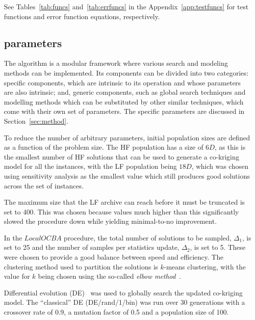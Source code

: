 See Tables~\ref{tab:funcs} and~\ref{tab:errfuncs} in the Appendix~\ref{app:testfuncs} for test functions and error function equations, respectively.

\subsection{\AlgName{} parameters}
The \AlgName{} algorithm is a modular framework where various search and modeling methods can be implemented. Its components can be divided into two categories: \AlgName{} specific components, which are intrinsic to its operation and whose parameters are also intrinsic; and, generic components, such as global search techniques and modelling methods which can be substituted by other similar techniques, which come with their own set of parameters. The \AlgName{} specific parameters are discussed in Section~\ref{sec:method}.

To reduce the number of arbitrary parameters, initial population sizes are defined as a function of the problem size. The HF population has a size of $6D$, as this is the smallest number of HF solutions that can be used to generate a co-kriging model for all the instances, with the LF population being $18D$, which was chosen using sensitivity analysis as the smallest value which still produces good solutions across the set of instances.

The maximum size that the LF archive can reach before it must be truncated is set to 400. This was chosen because values much higher than this significantly slowed the procedure down while yielding minimal-to-no improvement. 

In the $LocalOCBA$ procedure, the total number of solutions to be sampled, $\Delta_1$, is set to 25 and the number of samples per statistics update, $\Delta_2$, is set to 5. These were chosen to provide a good balance between speed and efficiency. The clustering method used to partition the solutions is $k$-means clustering, with the value for $k$ being chosen using the so-called \emph{elbow method}~\cite{leonard1990finding}.

Differential evolution (DE)~\cite{storn1997differential} was used to globally search the updated co-kriging model. The ``classical'' DE (DE/rand/1/bin) was run over 30 generations with a crossover rate of 0.9, a mutation factor of 0.5 and a population size of 100.

